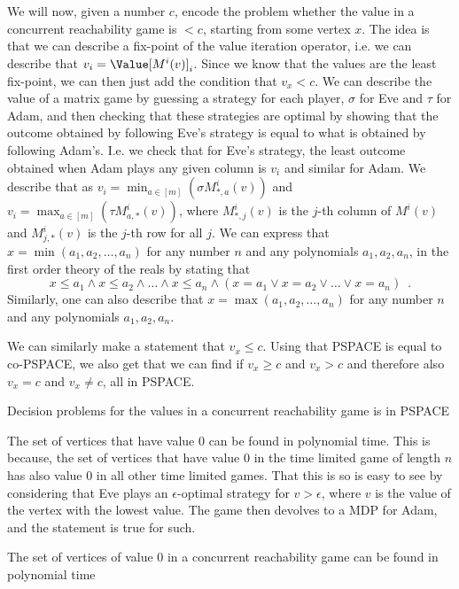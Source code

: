We will now, given a number $c$, encode the problem whether the value in a concurrent reachability game is  $<c$, starting from some vertex $x$.
The idea is that we can describe a fix-point of the value iteration operator, i.e.
we can describe that $v_i=\Value[M^i(v)]_i$. Since we know that the values are the least fix-point, we can then just add the condition that $v_x<c$. 
We can describe the value of a matrix game by guessing a strategy for each player, $\sigma$ for Eve and $\tau$ for Adam, and then checking that these strategies are optimal by showing that the outcome obtained by following Eve's strategy is equal to what is obtained by following Adam's.
I.e. we check that for Eve's strategy, the least outcome obtained when Adam plays any given column is $v_i$ and similar for Adam.
We describe that as $v_i=\min_{a\in [m]} (\sigma M^i_{*,a}(v))$ and $v_i=\max_{a\in [m]} (\tau M^i_{a,*}(v))$, where $M^i_{*,j}(v)$ is the $j$-th column of $M^i(v)$ and $M^i_{j,*}(v)$ is the $j$-th row for all $j$. 
We can express that $x=\min(a_1,a_2,\dots,a_n)$ for any number $n$ and any polynomials $a_1,a_2,a_n$, in the first order theory of the reals by stating that \[
x\leq a_1\wedge x\leq a_2\wedge \dots \wedge x\leq a_n \wedge (x=a_1\vee x=a_2\vee \dots \vee x=a_n) \enspace .\]
Similarly, one can also describe that $x=\max(a_1,a_2,\dots,a_n)$ for any number $n$ and any polynomials $a_1,a_2,a_n$.

We can similarly make a statement that $v_x\leq c$. Using that PSPACE is equal to co-PSPACE, we also get that we can find if $v_x\geq c$ and $v_x>c$ and therefore also $v_x=c$ and $v_x\neq c$, all in PSPACE.

\begin{lemma}
Decision problems for the values in a concurrent reachability game is in PSPACE
\end{lemma}

The set of vertices that have value 0 can be found in polynomial time. This is because, the set of vertices that have value 0 in the time limited game of length $n$ has also value 0 in all other time limited games. That this is so is easy to see by considering that Eve plays an $\epsilon$-optimal strategy for $v>\epsilon$, where $v$ is the value of the vertex with the lowest value. The game then devolves to a MDP for Adam, and the statement is true for such.

\begin{lemma}\label{lemm:find_0_reach}
The set of vertices of value 0 in a concurrent reachability game can be found in polynomial time
\end{lemma}

